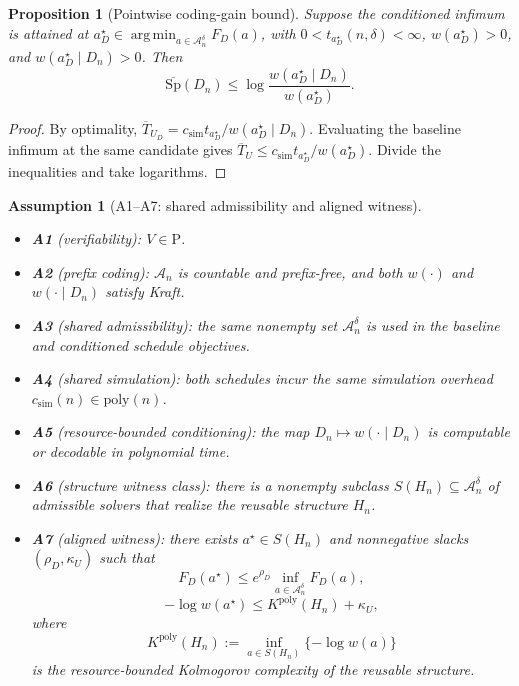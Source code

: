 \documentclass[10pt]{article}
\DeclareMathOperator*{\argmin}{arg\,min}
\theoremstyle{paperplain}
\newtheorem{proposition}[theorem]{Proposition}
\theoremstyle{paperdefinition}
\newtheorem{assumption}[theorem]{Assumption}
\theoremstyle{paperremark}
\newcommand{\poly}{\mathrm{poly}}
\newcommand{\cA}{\mathcal{A}}
\newcommand{\Sp}{\mathrm{Sp}}
\begin{document}
\begin{proposition}[Pointwise coding-gain bound]
\label{prop:coding-gain}
Suppose the conditioned infimum is attained at
$a_D^\star\in\argmin_{a\in\cA_n^\delta}F_D(a)$, with $0<t_{a_D^\star}(n,\delta)<\infty$, $w(a_D^\star)>0$, and $w(a_D^\star\mid D_n)>0$. Then
\[
\overline{\Sp}(D_n)
\le
\log\frac{w(a_D^\star\mid D_n)}{w(a_D^\star)}.
\]
\end{proposition}

\begin{proof}
By optimality,
$\overline T_{U_D}=c_{\mathrm{sim}}t_{a_D^\star}/w(a_D^\star\mid D_n)$.
Evaluating the baseline infimum at the same candidate gives
$\overline T_U\le c_{\mathrm{sim}}t_{a_D^\star}/w(a_D^\star)$.
Divide the inequalities and take logarithms.
\end{proof}

\begin{assumption}[A1--A7: shared admissibility and aligned witness]\label{ass:upper-envelope}
\leavevmode
\begin{itemize}
\item \textbf{A1} (verifiability): $V\in \mathrm{P}$.
\item \textbf{A2} (prefix coding): $\cA_n$ is countable and prefix-free, and both $w(\cdot)$ and $w(\cdot\mid D_n)$ satisfy Kraft.
\item \textbf{A3} (shared admissibility): the same nonempty set $\cA_n^\delta$ is used in the baseline and conditioned schedule objectives.
\item \textbf{A4} (shared simulation): both schedules incur the same simulation overhead $c_{\mathrm{sim}}(n)\in\poly(n)$.
\item \textbf{A5} (resource-bounded conditioning): the map $D_n\mapsto w(\cdot\mid D_n)$ is computable or decodable in polynomial time.
\item \textbf{A6} (structure witness class): there is a nonempty subclass $S(H_n)\subseteq \cA_n^\delta$ of admissible solvers that realize the reusable structure $H_n$.
\item \textbf{A7} (aligned witness): there exists $a^\star\in S(H_n)$ and nonnegative slacks $(\rho_D,\kappa_U)$ such that
\[
F_D(a^\star)\le e^{\rho_D}\inf_{a\in\cA_n^\delta}F_D(a),
\]
\[
-\log w(a^\star)\le K^{\poly}(H_n)+\kappa_U,
\]
where
\[
K^{\poly}(H_n):=\inf_{a\in S(H_n)}\{-\log w(a)\}
\]
is the resource-bounded Kolmogorov complexity of the reusable structure.
\end{itemize}
\end{assumption}
\end{document}
